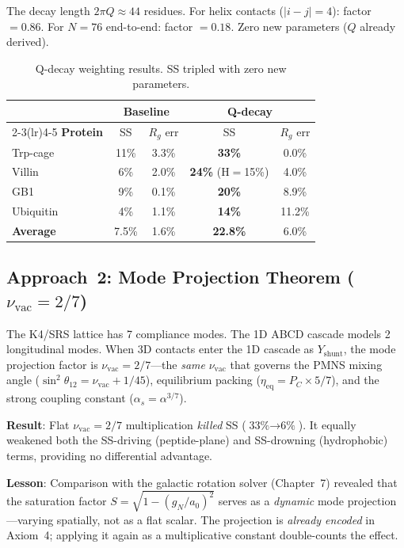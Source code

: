 \noindent The decay length $2\pi Q \approx 44$ residues.  For helix contacts ($|i-j|=4$): factor $= 0.86$.  For $N=76$ end-to-end: factor $= 0.18$.  Zero new parameters ($Q$ already derived).

\begin{table}[H]
\centering
\caption{Q-decay weighting results.  SS tripled with zero new parameters.}
\label{tab:qdecay_results}
\begin{tabular}{@{}l cc cc@{}}
\toprule
 & \multicolumn{2}{c}{\textbf{Baseline}} & \multicolumn{2}{c}{\textbf{Q-decay}} \\
\cmidrule(lr){2-3}\cmidrule(lr){4-5}
\textbf{Protein} & SS & $R_g$ err & SS & $R_g$ err \\
\midrule
Trp-cage   & 11\%  & 3.3\%  & \textbf{33\%} & 0.0\%  \\
Villin     & 6\%   & 2.0\%  & \textbf{24\%} (H$=$15\%) & 4.0\%  \\
GB1        & 9\%   & 0.1\%  & \textbf{20\%} & 8.9\%  \\
Ubiquitin  & 4\%   & 1.1\%  & \textbf{14\%} & 11.2\% \\
\midrule
\textbf{Average} & 7.5\% & 1.6\% & \textbf{22.8\%} & 6.0\% \\
\bottomrule
\end{tabular}
\end{table}

\subsection{Approach~2: Mode Projection Theorem ($\nu_\text{vac} = 2/7$)}

The K4/SRS lattice has 7 compliance modes.  The 1D ABCD cascade models 2 longitudinal modes.  When 3D contacts enter the 1D cascade as $Y_\text{shunt}$, the mode projection factor is $\nu_\text{vac} = 2/7$---the \emph{same} $\nu_\text{vac}$ that governs the PMNS mixing angle ($\sin^2\theta_{12} = \nu_\text{vac} + 1/45$), equilibrium packing ($\eta_\text{eq} = P_C \times 5/7$), and the strong coupling constant ($\alpha_s = \alpha^{3/7}$).

\textbf{Result}: Flat $\nu_\text{vac} = 2/7$ multiplication \emph{killed} SS ($\text{33\%} \to \text{6\%}$).  It equally weakened both the SS-driving (peptide-plane) and SS-drowning (hydrophobic) terms, providing no differential advantage.

\textbf{Lesson}: Comparison with the galactic rotation solver (Chapter~7) revealed that the saturation factor $S = \sqrt{1 - (g_N/a_0)^2}$ serves as a \emph{dynamic} mode projection---varying spatially, not as a flat scalar.  The projection is \emph{already encoded} in Axiom~4; applying it again as a multiplicative constant double-counts the effect.

